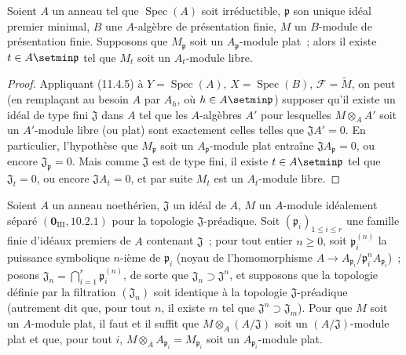 \begin{corollary}[11.4.6]
\label{IV.11.4.6-fr}
Soient $A$ un anneau tel que $\operatorname{Spec}(A)$ soit irréductible,
$\mathfrak p$ son unique idéal premier minimal, $B$ une $A$-algèbre de
présentation finie, $M$ un $B$-module de présentation finie. Supposons que
$M_\mathfrak p$ soit un $A_\mathfrak p$-module plat~; alors il existe
$t\in A\setmin\mathfrak p$ tel que $M_t$ soit un $A_t$-module libre.
\end{corollary}

\begin{proof}
Appliquant (11.4.5) à $Y=\operatorname{Spec}(A)$, $X=\operatorname{Spec}(B)$,
$\mathcal F=\widetilde M$, on peut (en remplaçant au besoin $A$ par $A_h$, où
$h\in A\setmin\mathfrak p$) supposer qu'il existe un idéal de type fini
$\mathfrak J$ dans $A$ tel que les $A$-algèbres $A'$ pour lesquelles
$M\otimes_A A'$ soit un $A'$-module libre (ou plat) sont exactement celles
telles que $\mathfrak JA'=0$. En particulier, l'hypothèse que
$M_\mathfrak p$ soit un $A_\mathfrak p$-module plat entraîne
$\mathfrak JA_\mathfrak p=0$, ou encore $\mathfrak J_\mathfrak p=0$. Mais
comme $\mathfrak J$ est de type fini, il existe $t\in A\setmin\mathfrak p$ tel que
$\mathfrak J_t=0$, ou encore $\mathfrak JA_t=0$, et par suite $M_t$ est un
$A_t$-module libre.
\end{proof}

\begin{proposition}[11.4.7]
\label{IV.11.4.7-fr}
Soient $A$ un anneau noethérien, $\mathfrak J$ un idéal de $A$, $M$ un
$A$-module idéalement séparé $(\mathbf 0_{\mathrm{III}},10.2.1)$ pour la
topologie $\mathfrak J$-préadique. Soit $(\mathfrak p_i)_{1\leq i\leq r}$ une
famille finie d'idéaux premiers de $A$ contenant $\mathfrak J$~; pour tout
entier $n\geq0$, soit $\mathfrak p_i^{(n)}$ la puissance symbolique $n$-ième de
$\mathfrak p_i$ (noyau de l'homomorphisme
$A\to A_{\mathfrak p_i}/\mathfrak p_i^nA_{\mathfrak p_i}$)~; posons
$\mathfrak J_n=\bigcap_{i=1}^{r}\mathfrak p_i^{(n)}$, de sorte que
$\mathfrak J_n\supset\mathfrak J^n$, et supposons que la topologie définie par
la filtration $(\mathfrak J_n)$ soit identique à la topologie
$\mathfrak J$-préadique (autrement dit que, pour tout $n$, il existe $m$ tel
que $\mathfrak J^n\supset\mathfrak J_m$). Pour que $M$ soit un $A$-module
plat, il faut et il suffit que $M\otimes_A(A/\mathfrak J)$ soit un
$(A/\mathfrak J)$-module plat et que, pour tout $i$,
$M\otimes_AA_{\mathfrak p_i}=M_{\mathfrak p_i}$ soit un
$A_{\mathfrak p_i}$-module plat.
\end{proposition}

